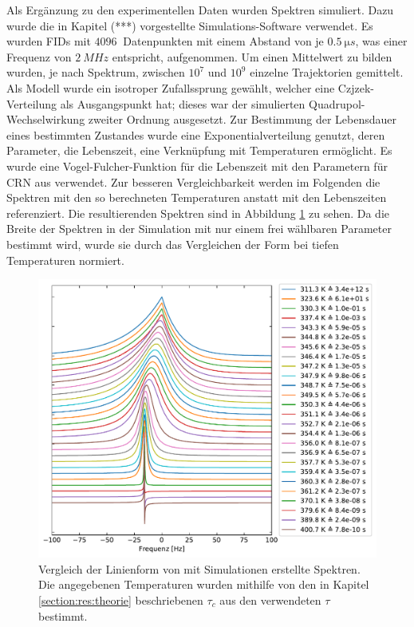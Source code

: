 Als Ergänzung zu den experimentellen Daten wurden Spektren simuliert. Dazu wurde die in Kapitel (***) vorgestellte Simulations-Software verwendet. Es wurden FIDs mit $\SI{4096}{}$ Datenpunkten mit einem Abstand von je $\SI{0.5}{\micro s}$, was einer Frequenz von $\SI{2}{MHz}$ entspricht, aufgenommen. Um einen Mittelwert zu bilden wurden, je nach Spektrum, zwischen $10^{7}$ und $10^{9}$ einzelne Trajektorien gemittelt. Als Modell wurde ein isotroper Zufallssprung gewählt, welcher eine Czjzek-Verteilung als Ausgangspunkt hat; dieses war der simulierten Quadrupol-Wechselwirkung zweiter Ordnung ausgesetzt. Zur Bestimmung der Lebensdauer eines bestimmten Zustandes wurde eine Exponentialverteilung genutzt, deren Parameter, die Lebenszeit, eine Verknüpfung mit Temperaturen ermöglicht. Es wurde eine Vogel-Fulcher-Funktion für die Lebenszeit mit den Parametern für CRN aus \cite{PIMENOV199793} verwendet. Zur besseren Vergleichbarkeit werden im Folgenden die Spektren mit den so berechneten Temperaturen anstatt mit den Lebenszeiten referenziert. Die resultierenden Spektren sind in Abbildung \ref{fig:res:sim_linienform} zu sehen. Da die Breite der Spektren in der Simulation mit nur einem frei wählbaren Parameter bestimmt wird, wurde sie durch das Vergleichen der Form bei tiefen Temperaturen normiert.
\begin{figure}
	\begin{center}
		\includegraphics[width=\textwidth]{graphics/plot/sim_lineshape.pdf}
	\end{center}
	\caption{Vergleich der Linienform von mit Simulationen erstellte Spektren. Die angegebenen Temperaturen wurden mithilfe von den in Kapitel \ref{section:res:theorie} beschriebenen $\tau_c$ aus den verwendeten $\tau$ bestimmt.} \label{fig:res:sim_linienform}
\end{figure}

